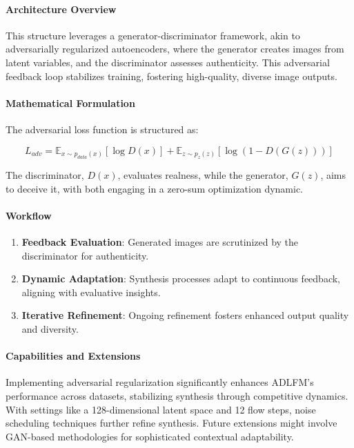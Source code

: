 \documentclass{article} %
\begin{document}
\paragraph{Architecture Overview}
This structure leverages a generator-discriminator framework, akin to adversarially regularized autoencoders, where the generator creates images from latent variables, and the discriminator assesses authenticity. This adversarial feedback loop stabilizes training, fostering high-quality, diverse image outputs.

\paragraph{Mathematical Formulation}
The adversarial loss function is structured as:

\begin{equation}
L_{adv} = \mathbb{E}_{x \sim p_{data}(x)} [\log D(x)] + \mathbb{E}_{z \sim p_{z}(z)} [\log(1 - D(G(z)))]
\end{equation}

The discriminator, \( D(x) \), evaluates realness, while the generator, \( G(z) \), aims to deceive it, with both engaging in a zero-sum optimization dynamic.

\paragraph{Workflow}
\begin{enumerate}
    \item \textbf{Feedback Evaluation}: Generated images are scrutinized by the discriminator for authenticity.
    \item \textbf{Dynamic Adaptation}: Synthesis processes adapt to continuous feedback, aligning with evaluative insights.
    \item \textbf{Iterative Refinement}: Ongoing refinement fosters enhanced output quality and diversity.
\end{enumerate}

\paragraph{Capabilities and Extensions}
Implementing adversarial regularization significantly enhances ADLFM's performance across datasets, stabilizing synthesis through competitive dynamics. With settings like a 128-dimensional latent space and 12 flow steps, noise scheduling techniques further refine synthesis. Future extensions might involve GAN-based methodologies for sophisticated contextual adaptability.
\end{document}

